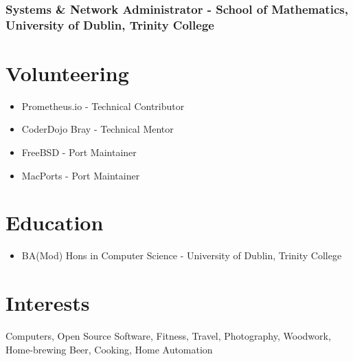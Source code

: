 \documentclass[a4paper, 10pt] {article}
\begin{document}
\subsubsection*{Systems \& Network Administrator - School of Mathematics, University of Dublin, Trinity College}

\hrulefill

\section*{Volunteering}

\begin{itemize}[noitemsep]
  \item Prometheus.io - Technical Contributor
  \item CoderDojo Bray - Technical Mentor
  \item FreeBSD - Port Maintainer
  \item MacPorts - Port Maintainer
\end{itemize}

\hrulefill

\section*{Education}

\begin{itemize}
  \item BA(Mod) Hons in Computer Science - University of Dublin, Trinity College
\end{itemize}

\hrulefill

\section*{Interests}

Computers, Open Source Software, Fitness, Travel, Photography, Woodwork,
Home-brewing Beer, Cooking, Home Automation
\end{document}
